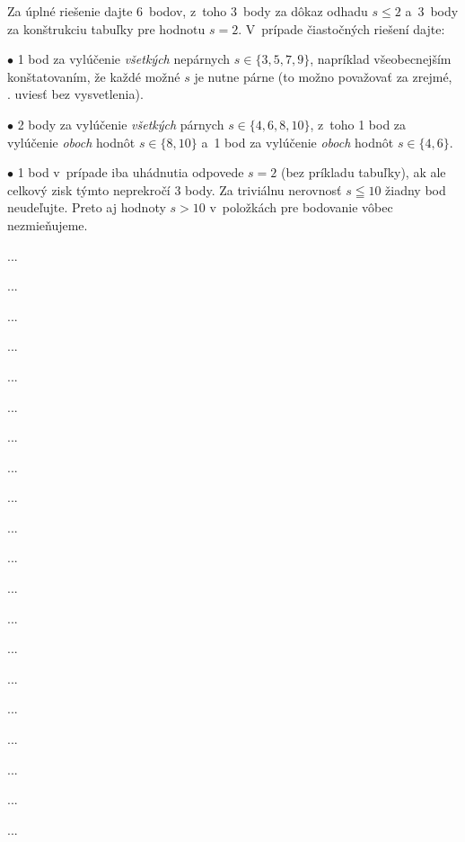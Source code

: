 {\schemaABC
Za úplné riešenie dajte 6~bodov, z~toho 3~body za dôkaz
odhadu $s\leq2$ a~3~body za konštrukciu tabuľky pre hodnotu $s=2$.
V~prípade čiastočných riešení dajte:
\item{$\bullet$} 1 bod za vylúčenie {\it všetkých\/} nepárnych $s\in\{3,5,7,9\}$, napríklad všeobecnejším konštatovaním, že každé možné $s$ je nutne párne (to možno považovať za zrejmé, \tj. uviesť bez vysvetlenia).
\item{$\bullet$} 2 body za vylúčenie {\it všetkých\/} párnych $s\in\{4,6,8,10\}$, z~toho 1 bod za vylúčenie {\it oboch\/} hodnôt $s\in\{8,10\}$ a~1 bod za vylúčenie {\it oboch\/} hodnôt $s\in\{4,6\}$.
\item{$\bullet$}
1 bod v~prípade iba uhádnutia odpovede $s=2$ (bez príkladu
tabuľky), ak ale celkový zisk týmto neprekročí 3 body.
\endgraf\noindent
Za triviálnu nerovnosť $s\leqq10$ žiadny bod neudeľujte. Preto
aj hodnoty $s>10$ v~položkách pre bodovanie vôbec nezmieňujeme.
\endschema
}

{%
...}

{%
...}

{%
...}

{%
...}

{%
...}

{%
...}

{%
...}

{%
...}

{%
...}

{%
...}

{%
...}

{%
...}

{%
...}

{%
...}

{%
...}

{%
...}

{%
...}

{%
...}

{%
...}

{%
...}

